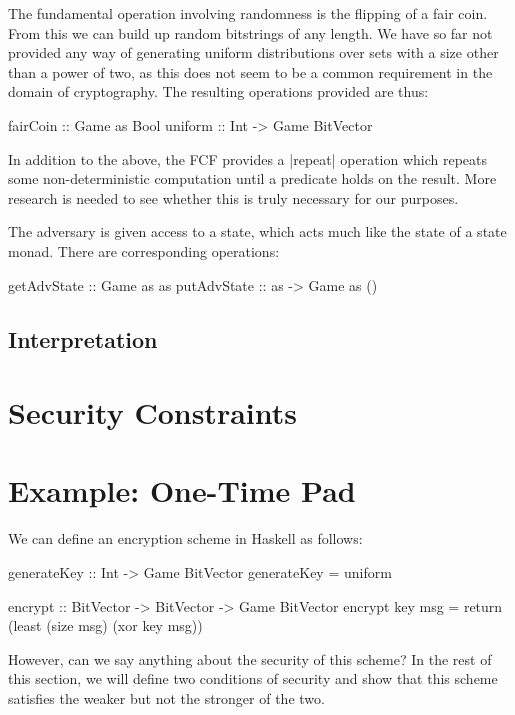 The fundamental operation involving randomness is the flipping of a fair coin.  From this we can build up random
bitstrings of any length.  We have so far not provided any way of generating uniform distributions over sets with a size
other than a power of two, as this does not seem to be a common requirement in the domain of cryptography.  The
resulting operations provided are thus:
\begin{code}
fairCoin :: Game as Bool
uniform :: Int -> Game BitVector
\end{code}

In addition to the above, the FCF provides a |repeat| operation which repeats some non-deterministic computation until a
predicate holds on the result.  More research is needed to see whether this is truly necessary for our purposes.

The adversary is given access to a state, which acts much like the state of a state monad.  There are corresponding
operations:
\begin{code}
getAdvState :: Game as as
putAdvState :: as -> Game as ()
\end{code}




\subsection{Interpretation}





\section{Security Constraints}



\section{Example: One-Time Pad}

We can define an encryption scheme in Haskell as follows:
\begin{code}
    generateKey :: Int -> Game BitVector
    generateKey = uniform

    encrypt :: BitVector -> BitVector -> Game BitVector
    encrypt key msg = return (least (size msg) (xor key msg))
\end{code}

However, can we say anything about the security of this scheme?  In the rest of this section, we will define two
conditions of security and show that this scheme satisfies the weaker but not the stronger of the two.

